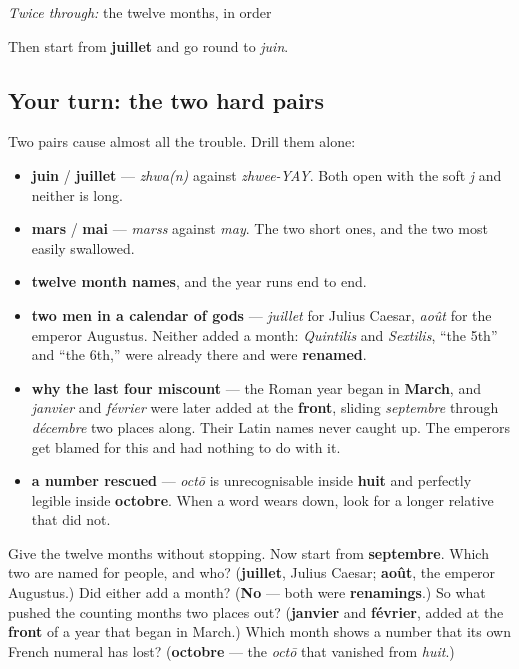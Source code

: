 \emph{Twice through:} the twelve months, in order

Then start from \textbf{juillet} and go round to \emph{juin}.

\subsection*{Your turn: the two hard pairs}
Two pairs cause almost all the trouble. Drill them alone:

\begin{itemize}
\raggedright
  \item \textbf{juin} / \textbf{juillet} — \emph{zhwa(n)} against \emph{zhwee-YAY}. Both open with the soft \emph{j} and neither is long.
  \item \textbf{mars} / \textbf{mai} — \emph{marss} against \emph{may}. The two short ones, and the two most easily swallowed.
\end{itemize}

\begin{grammarlens}[title={What you've built this chapter}]
\begin{itemize}
\raggedright
  \item \textbf{twelve month names}, and the year runs end to end.
  \item \textbf{two men in a calendar of gods} — \emph{juillet} for Julius Caesar, \emph{août} for the emperor Augustus. Neither added a month: \emph{Quintilis} and \emph{Sextilis}, \textquotedblleft{}the 5th\textquotedblright{} and \textquotedblleft{}the 6th,\textquotedblright{} were already there and were \textbf{renamed}.
  \item \textbf{why the last four miscount} — the Roman year began in \textbf{March}, and \emph{janvier} and \emph{février} were later added at the \textbf{front}, sliding \emph{septembre} through \emph{décembre} two places along. Their Latin names never caught up. The emperors get blamed for this and had nothing to do with it.
  \item \textbf{a number rescued} — \emph{octō} is unrecognisable inside \textbf{huit} and perfectly legible inside \textbf{octobre}. When a word wears down, look for a longer relative that did not.
\end{itemize}
\end{grammarlens}

\begin{tcolorbox}[breakable,colback=teal!4,colframe=teal!35!black,title={Before you move on}]
Give the twelve months without stopping. Now start from \textbf{septembre}. Which two are named for people, and who? (\textbf{juillet}, Julius Caesar; \textbf{août}, the emperor Augustus.) Did either add a month? (\textbf{No} — both were \textbf{renamings}.) So what pushed the counting months two places out? (\textbf{janvier} and \textbf{février}, added at the \textbf{front} of a year that began in March.) Which month shows a number that its own French numeral has lost? (\textbf{octobre} — the \emph{octō} that vanished from \emph{huit}.)
\end{tcolorbox}
